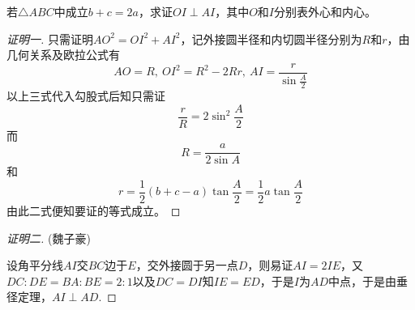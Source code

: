 \begin{exercise}
 若$\triangle ABC$中成立$b+c=2a$，求证$OI \perp AI$，其中$O$和$I$分别表外心和内心。
\end{exercise}

\begin{proof}[证明一]
  只需证明$AO^2=OI^2+AI^2$，记外接圆半径和内切圆半径分别为$R$和$r$，由几何关系及欧拉公式有
  \[ AO=R, \  OI^2=R^2-2Rr, \  AI=\frac{r}{\sin{\frac{A}{2}}} \]
  以上三式代入勾股式后知只需证
  \[ \frac{r}{R}=2\sin^2{\frac{A}{2}} \]
  而
  \[ R=\frac{a}{2\sin{A}} \]
  和
  \[ r=\frac{1}{2}(b+c-a)\tan{\frac{A}{2}}=\frac{1}{2}a\tan{\frac{A}{2}} \]
  由此二式便知要证的等式成立。
\end{proof}

\begin{proof}[证明二](魏子豪)

  设角平分线$AI$交$BC$边于$E$，交外接圆于另一点$D$，则易证$AI=2IE$，又$DC:DE=BA:BE=2:1$以及$DC=DI$知$IE=ED$，于是$I$为$AD$中点，于是由垂径定理，$AI \perp AD$.
\end{proof}

